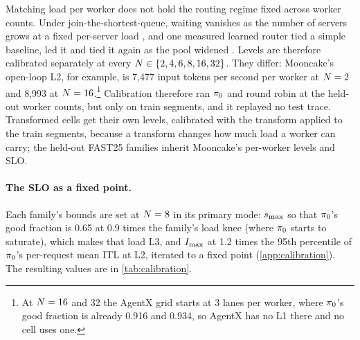 Matching load per worker does not hold the routing regime fixed across worker counts. Under
join-the-shortest-queue, waiting vanishes as the number of servers grows at a fixed per-server
load \citep{vanderboor2022survey}, and one measured learned router tied a simple baseline, led it
and tied it again as the pool widened \citep{tumkur2026calibrate}. Levels are therefore calibrated separately at every
$N \in \{2,4,6,8,16,32\}$. They differ: Mooncake's open-loop L2, for example, is 7,477 input
tokens per second per worker at $N = 2$ and 8,993 at $N = 16$.\footnote{At $N = 16$ and 32
  the AgentX grid starts at 3 lanes per worker, where $\pi_{0}$'s good fraction is already 0.916 and
  0.934, so AgentX has no L1 there and no cell uses one.}
Calibration therefore ran $\pi_{0}$ and round robin at the held-out worker counts, but only on
train segments, and it replayed no test trace.
Transformed cells get their own levels, calibrated with the transform applied to the train
segments, because a transform changes how much load a worker can carry; the held-out FAST25
families inherit Mooncake's per-worker levels and SLO.

\paragraph{The SLO as a fixed point.}
Each family's bounds are set at $N = 8$ in its primary mode: $s_{\max}$ so that $\pi_{0}$'s good
fraction is 0.65 at 0.9 times the family's load knee (where $\pi_{0}$ starts to saturate), which
makes that load L3, and $I_{\max}$ at 1.2 times the 95th percentile of $\pi_{0}$'s per-request mean
ITL at L2, iterated to a fixed point (\cref{app:calibration}). The resulting values are in
\cref{tab:calibration}.


